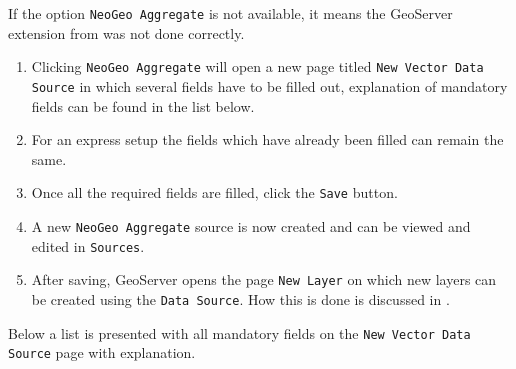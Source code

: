 \noindent If the option \lstinline|NeoGeo Aggregate| is not available, it
means the GeoServer extension from  was not done
correctly.

\begin{enumerate}[resume]
	\item Clicking \lstinline|NeoGeo Aggregate| will open a new page titled \lstinline|New Vector Data Source| in which several fields have to be filled out, explanation of mandatory fields can be found in the list below.
	\item For an express setup the fields which have already been filled can remain the same.
	\item Once all the required fields are filled, click the \lstinline|Save| button.
	\item A new \lstinline|NeoGeo Aggregate| source is now created and can be viewed and edited in \lstinline|Sources|.
	\item After saving, GeoServer opens the page \lstinline|New Layer| on which new layers can be created using the \lstinline|Data Source|. How this is done is discussed in .
\end{enumerate}

\noindent Below a list is presented with all mandatory fields on the
\lstinline|New Vector Data Source| page with explanation.

